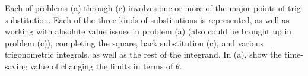 \documentclass[handout]{ximera}
\begin{document}
\begin{instructorNotes}
Each of problems (a) through (c) involves one or more of the major points of trig substitution.  
Each of the three kinds of substitutions is represented, as well as working with absolute value issues in problem (a) (also could be brought up in problem (c)), completing the square, back substitution (c), and various trigonometric integrals.  
 as well as the rest of the integrand.  
In  (a), show the time-saving value of changing the limits in terms of $\theta$.  
\end{instructorNotes}















	
	
	
	
	
	
	
	
	

	










								
				
				
	
\end{document}
